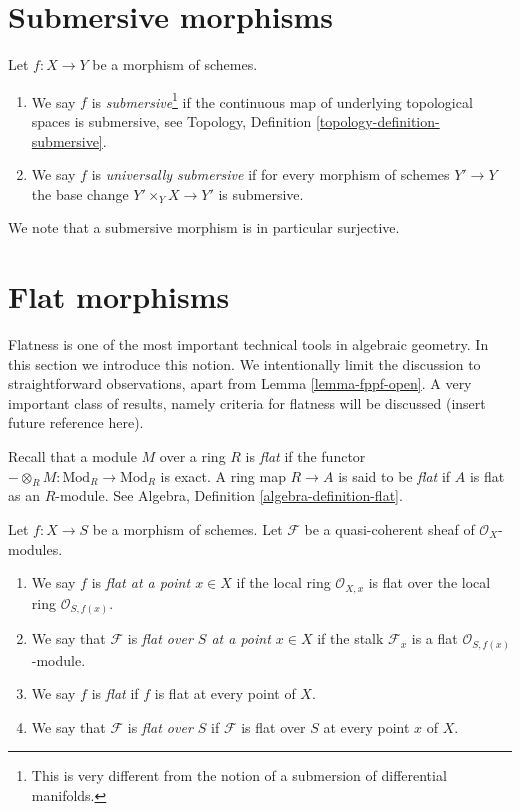 \section{Submersive morphisms}
\label{section-submersive}

\begin{definition}
\label{definition-submersive}
Let $f : X \to Y$ be a morphism of schemes.
\begin{enumerate}
\item We say $f$ is {\it submersive}\footnote{This is very different
from the notion of a submersion of differential manifolds.}
if the continuous map of underlying topological spaces is submersive, see
Topology, Definition \ref{topology-definition-submersive}.
\item We say $f$ is {\it universally submersive} if for every
morphism of schemes $Y' \to Y$ the base change
$Y' \times_Y X \to Y'$ is submersive.
\end{enumerate}
\end{definition}

\noindent
We note that a submersive morphism is in particular surjective.









\section{Flat morphisms}
\label{section-flat}

\noindent
Flatness is one of the most important technical tools in algebraic geometry.
In this section we introduce this notion. We intentionally limit the discussion
to straightforward observations, apart from Lemma \ref{lemma-fppf-open}.
A very important class of results, namely criteria for flatness will
be discussed (insert future reference here).

\medskip\noindent
Recall that a module $M$ over a ring $R$ is {\it flat} if the functor
$-\otimes_R M : \text{Mod}_R \to \text{Mod}_R$ is exact. A ring map
$R \to A$ is said to be {\it flat} if $A$ is flat as an $R$-module.
See
Algebra, Definition \ref{algebra-definition-flat}.

\begin{definition}
\label{definition-flat}
Let $f : X \to S$ be a morphism of schemes.
Let $\mathcal{F}$ be a quasi-coherent sheaf of $\mathcal{O}_X$-modules.
\begin{enumerate}
\item We say $f$ is {\it flat at a point $x \in X$} if the
local ring $\mathcal{O}_{X, x}$ is flat over the local ring
$\mathcal{O}_{S, f(x)}$.
\item We say that $\mathcal{F}$ is {\it flat over $S$ at a point $x \in X$}
if the stalk $\mathcal{F}_x$ is a flat $\mathcal{O}_{S, f(x)}$-module.
\item We say $f$ is {\it flat} if $f$ is flat at every point of $X$.
\item We say that $\mathcal{F}$ is {\it flat over $S$} if
$\mathcal{F}$ is flat over $S$ at every point $x$ of $X$.
\end{enumerate}
\end{definition}


